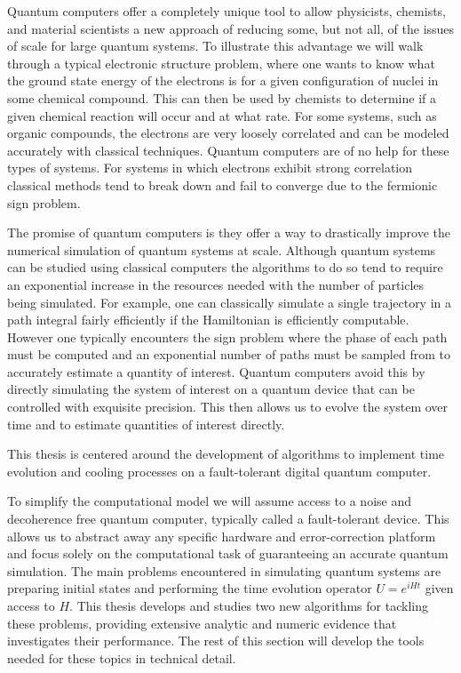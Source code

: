Quantum computers offer a completely unique tool to allow physicists, chemists, and material scientists a new approach of reducing some, but not all, of the issues of scale for large quantum systems. To illustrate this advantage we will walk through a typical electronic structure problem, where one wants to know what the ground state energy of the electrons is for a given configuration of nuclei in some chemical compound. This can then be used by chemists to determine if a given chemical reaction will occur and at what rate. For some systems, such as organic compounds, the electrons are very loosely correlated and can be modeled accurately with classical techniques. Quantum computers are of no help for these types of systems. For systems in which electrons exhibit strong correlation classical methods tend to break down and fail to converge due to the fermionic sign problem. 

The promise of quantum computers is they offer a way to drastically improve the numerical simulation of quantum systems at scale. Although quantum systems can be studied using classical computers the algorithms to do so tend to require an exponential increase in the resources needed with the number of particles being simulated. For example, one can classically simulate a single trajectory in a path integral fairly efficiently if the Hamiltonian is efficiently computable. However one typically encounters the sign problem where the phase of each path must be computed and an exponential number of paths must be sampled from to accurately estimate a quantity of interest. Quantum computers avoid this by directly simulating the system of interest on a quantum device that can be controlled with exquisite precision. This then allows us to evolve the system over time and to estimate quantities of interest directly. 

This thesis is centered around the development of algorithms to implement time evolution and cooling processes on a fault-tolerant digital quantum computer. 

To simplify the computational model we will assume access to a noise and decoherence free quantum computer, typically called a fault-tolerant device. This allows us to abstract away any specific hardware and error-correction platform and focus solely on the computational task of guaranteeing an accurate quantum simulation. The main problems encountered in simulating quantum systems are preparing initial states and performing the time evolution operator $U = e^{i H t}$ given access to $H$. This thesis develops and studies two new algorithms for tackling these problems, providing extensive analytic and numeric evidence that investigates their performance. The rest of this section will develop the tools needed for these topics in technical detail. 